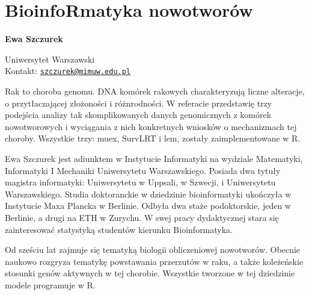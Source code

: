 \documentclass[\main/boa.tex]{subfiles}
\begin{document}
\section{BioinfoRmatyka nowotworów}


\begin{minipage}{0.915\textwidth}
	\centering
  {\bf \huge {} Ewa Szczurek}
\end{minipage}


\vskip 0.3cm

\begin{affiliations}
\begin{minipage}{0.915\textwidth}
\centering
\large Uniwersytet Warszawski  \\[5pt]
Kontakt: \href{mailto:szczurek@mimuw.edu.pl}{\nolinkurl{szczurek@mimuw.edu.pl}}\\
\end{minipage}
\end{affiliations}

\vskip 0.8cm

Rak to choroba genomu. DNA komórek rakowych charakteryzują liczne alteracje, o przytłaczającej złożoności i różnrodności. W referacie przedstawię trzy podejścia analizy tak skomplikowanych danych genomicznych z komórek nowotworowych i wyciągania z nich konkretnych wniosków o mechanizmach tej choroby. Wszystkie trzy: muex, SurvLRT i lem, zostały zaimplementowane w R. 

\bio
Ewa Szczurek jest adiunktem w Instytucie Informatyki na wydziale Matematyki, Informatyki I Mechaniki Uniwersytetu Warszawskiego. Posiada dwa tytuły magistra informatyki: Uniwersytetu w Uppsali, w Szwecji, i Uniwersytetu Warszawskiego. Studia doktoranckie w dziedzinie bioinformatyki ukończyła w Instytucie Maxa Plancka w Berlinie. Odbyła dwa staże podoktorskie, jeden w Berlinie, a drugi na ETH w Zurychu. W swej pracy dydaktycznej stara się zainteresować statystyką studentów kierunku Bioinformatyka.

Od sześciu lat zajmuje się tematyką biologii obliczeniowej nowotworów. Obecnie naukowo rozgryza tematykę powstawania przerzutów w raku, a także koleżeńskie stosunki genów aktywnych w tej chorobie. Wszystkie tworzone w tej dziedzinie modele programuje w R.
\end{document}
